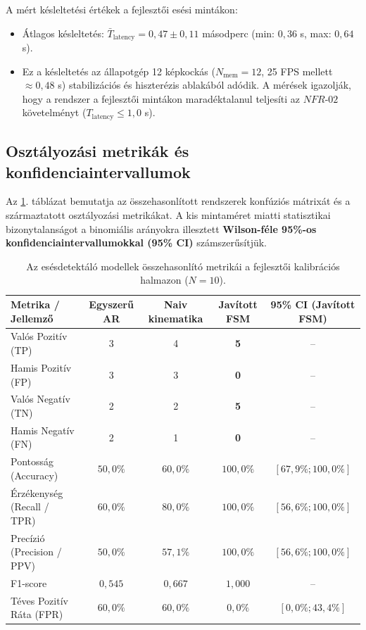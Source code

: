 \documentclass[12pt,a4paper,oneside]{report}
\begin{document}
A mért késleltetési értékek a fejlesztői esési mintákon:
\begin{itemize}
    \item Átlagos késleltetés: $\bar{T}_{\text{latency}} = 0{,}47 \pm 0{,}11$ másodperc (min: $0{,}36$ s, max: $0{,}64$ s).
    \item Ez a késleltetés az állapotgép 12 képkockás ($N_{\text{mem}} = 12$, 25 FPS mellett $\approx 0{,}48$ s) stabilizációs és hiszterézis ablakából adódik. A mérések igazolják, hogy a rendszer a fejlesztői mintákon maradéktalanul teljesíti az $NFR\text{-}02$ követelményt ($T_{\text{latency}} \le 1{,}0$ s).
\end{itemize}

\subsection{Osztályozási metrikák és konfidenciaintervallumok}
Az \ref{tab:metrics}. táblázat bemutatja az összehasonlított rendszerek konfúziós mátrixát és a származtatott osztályozási metrikákat. A kis mintaméret miatti statisztikai bizonytalanságot a binomiális arányokra illesztett \textbf{Wilson-féle 95\%-os konfidenciaintervallumokkal (95\% CI)} számszerűsítjük.

\begin{table}[H]
\centering
\small
\begin{tabularx}{\textwidth}{lcccc}
\toprule
\textbf{Metrika / Jellemző} & \textbf{Egyszerű AR} & \textbf{Naiv kinematika} & \textbf{Javított FSM} & \textbf{95\% CI (Javított FSM)} \\
\midrule
Valós Pozitív (TP) & 3 & 4 & \textbf{5} & -- \\
Hamis Pozitív (FP) & 3 & 3 & \textbf{0} & -- \\
Valós Negatív (TN) & 2 & 2 & \textbf{5} & -- \\
Hamis Negatív (FN) & 2 & 1 & \textbf{0} & -- \\
\midrule
Pontosság (Accuracy) & $50{,}0\%$ & $60{,}0\%$ & \textbf{$100{,}0\%$} & $[67{,}9\%; 100{,}0\%]$ \\
Érzékenység (Recall / TPR) & $60{,}0\%$ & $80{,}0\%$ & \textbf{$100{,}0\%$} & $[56{,}6\%; 100{,}0\%]$ \\
Precízió (Precision / PPV) & $50{,}0\%$ & $57{,}1\%$ & \textbf{$100{,}0\%$} & $[56{,}6\%; 100{,}0\%]$ \\
F1-score & $0{,}545$ & $0{,}667$ & \textbf{$1{,}000$} & -- \\
Téves Pozitív Ráta (FPR) & $60{,}0\%$ & $60{,}0\%$ & \textbf{$0{,}0\%$} & $[0{,}0\%; 43{,}4\%]$ \\
\bottomrule
\end{tabularx}
\caption{Az esésdetektáló modellek összehasonlító metrikái a fejlesztői kalibrációs halmazon ($N=10$).}
\label{tab:metrics}
\end{table}
\end{document}
